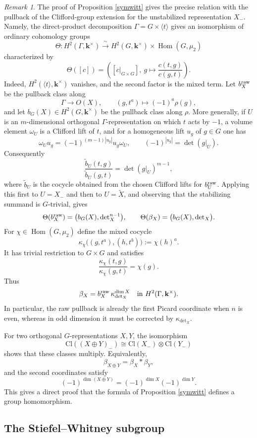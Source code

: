 \documentclass[12pt]{amsart}
\numberwithin{equation}{section}
\providecommand{\k}{}\renewcommand{\k}{\mathbf{k}}
\providecommand{\Cl}{}\renewcommand{\Cl}{\mathrm{Cl}}
\providecommand{\Hom}{}\renewcommand{\Hom}{\operatorname{Hom}}
\theoremstyle{plain}
\theoremstyle{definition}
\theoremstyle{remark}
\newtheorem{remark}[theorem]{Remark}
\begin{document}
\begin{remark}\label{precrel} The proof of Proposition \ref{symwitt} gives the precise relation
 with the pullback of the Clifford-group extension for the unstabilized representation $X_-$.  Namely, the direct-product decomposition $\Gamma=G\times\langle t\rangle$ gives an isomorphism of ordinary cohomology groups
\[
\Theta:H^2(\Gamma,\k^\times)\xrightarrow{\ \sim\ }
H^2(G,\k^\times)\times\Hom(G,\mu_2)
\]
characterized by
\[
\Theta([c])=
\left([c|_{G\times G}],\ g\longmapsto\frac{c(t,g)}{c(g,t)}\right).
\]
Indeed, $H^2(\langle t\rangle,\k^\times)$ vanishes, and the second factor is the mixed term.  Let $b_X^{\rm raw}$ be the pullback class along
\[
\Gamma\longrightarrow O(X),\qquad (g,t^a)\longmapsto(-1)^a\rho(g),
\]
and let $b_G(X)\in H^2(G,\k^\times)$ be the pullback class along $\rho$.  More generally, if $U$ is an $m$-dimensional orthogonal $\Gamma$-representation on which $t$ acts by $-1$, a volume element $\omega_U$ is a Clifford lift of $t$, and for a homogeneous lift $u_g$ of $g\in G$ one has
\[
\omega_Uu_g=(-1)^{(m-1)|u_g|}u_g\omega_U,
\qquad
(-1)^{|u_g|}=\det(g|_U).
\]
Consequently
\[
\frac{\widetilde b_U(t,g)}{\widetilde b_U(g,t)}=\det(g|_U)^{m-1},
\]
where $\widetilde b_U$ is the cocycle obtained from the chosen Clifford lifts for $b_U^{\rm raw}$.
Applying this first to $U=X_-$ and then to $U=\widetilde X$, and observing that the stabilizing summand is $G$-trivial, gives
\[
\Theta(b_X^{\rm raw})=\bigl(b_G(X),{\rm det}_X^{n-1}\bigr),
\qquad
\Theta(\beta_X)=\bigl(b_G(X),{\rm det}_X\bigr).
\]
For $\chi\in\Hom(G,\mu_2)$ define the mixed cocycle
\[
\kappa_\chi\bigl((g,t^a),(h,t^b)\bigr):=\chi(h)^a.
\]
It has trivial restriction to $G\times G$ and satisfies
\[
\frac{\kappa_\chi(t,g)}{\kappa_\chi(g,t)}=\chi(g).
\]
Thus
\[
\beta_X=b_X^{\rm raw}\,\kappa_{\det_X}^{\dim X}
\quad\text{in }H^2(\Gamma,\k^\times).
\]
In particular, the raw pullback is already the first Picard coordinate when $n$ is even, whereas in odd dimension it must be corrected by $\kappa_{\det_X}$.

For two orthogonal $G$-representations $X,Y$, the isomorphism
\[
\Cl((X\oplus Y)_-)\cong\Cl(X_-)\otimes\Cl(Y_-)
\]
shows that these classes multiply. Equivalently,
\[
\beta_{X\oplus Y}=\beta_X*\beta_Y,
\]
and the second coordinates satisfy
\[
(-1)^{\dim(X\oplus Y)}=(-1)^{\dim X}(-1)^{\dim Y}.
\]
This gives a direct proof that the formula of Proposition \ref{symwitt} defines a group homomorphism.
\end{remark} 

\subsection{The Stiefel--Whitney subgroup}
\end{document}
